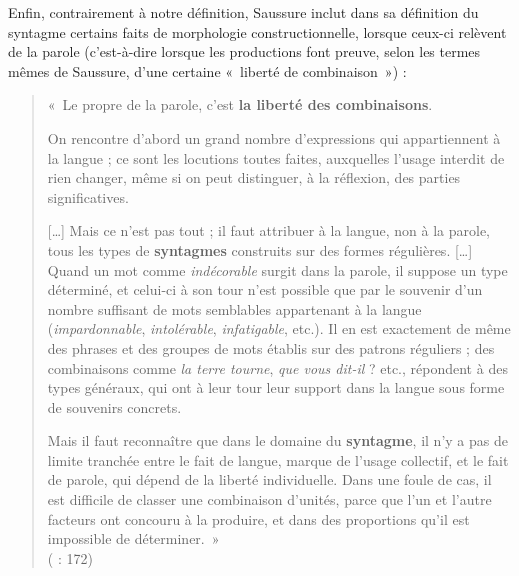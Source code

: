{    Enfin, contrairement à notre définition, Saussure inclut dans sa définition du syntagme certains faits de morphologie constructionnelle, lorsque ceux-ci relèvent de la parole (c’est-à-dire lorsque les productions font preuve, selon les termes mêmes de Saussure, d’une certaine «~liberté de combinaison~») :

    \begin{quote}
    «~Le propre de la parole, c’est \textbf{la liberté des combinaisons}.

    On rencontre d’abord un grand nombre d’expressions qui appartiennent à la langue ; ce sont les locutions toutes faites, auxquelles l’usage interdit de rien changer, même si on peut distinguer, à la réflexion, des parties significatives.

    […] Mais ce n’est pas tout ; il faut attribuer à la langue, non à la parole, tous les types de \textbf{syntagmes} construits sur des formes régulières. […] Quand un mot comme \textit{indécorable} surgit dans la parole, il suppose un type déterminé, et celui-ci à son tour n’est possible que par le souvenir d’un nombre suffisant de mots semblables appartenant à la langue (\textit{impardonnable}, \textit{intolérable}, \textit{infatigable}, etc.). Il en est exactement de même des phrases et des groupes de mots établis sur des patrons réguliers ; des combinaisons comme \textit{la terre tourne}, \textit{que vous dit-il} ? etc., répondent à des types généraux, qui ont à leur tour leur support dans la langue sous forme de souvenirs concrets.

    Mais il faut reconnaître que dans le domaine du \textbf{syntagme}, il n’y a pas de limite tranchée entre le fait de langue, marque de l’usage collectif, et le fait de parole, qui dépend de la liberté individuelle. Dans une foule de cas, il est difficile de classer une combinaison d’unités, parce que l’un et l’autre facteurs ont concouru à la produire, et dans des proportions qu’il est impossible de déterminer.~»\\
    (\citealt{saussure1916cours} : 172)
    \end{quote}

}
